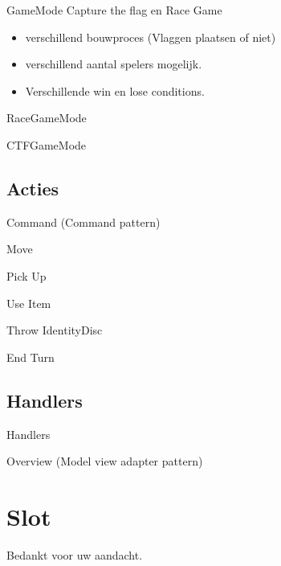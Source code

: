 \documentclass[11pt,t]{beamer}
\begin{document}
\begin{frame}{GameMode}
Capture the flag en Race Game
\begin{itemize}
\item verschillend bouwproces (Vlaggen plaatsen of niet)
\item verschillend aantal spelers mogelijk.
\item Verschillende win en lose conditions.
\end{itemize}

\end{frame}
\begin{frame}{RaceGameMode}
\end{frame}

\begin{frame}{CTFGameMode}
\end{frame}

\subsection{Acties}

\begin{frame}{Command (Command pattern)}
\end{frame}

\begin{frame}{Move}
\end{frame}

\begin{frame}{Pick Up}
\end{frame}

\begin{frame}{Use Item}
\end{frame}

\begin{frame}{Throw IdentityDisc}
\end{frame}

\begin{frame}{End Turn}
\end{frame}

\subsection{Handlers}

\begin{frame}{Handlers}
\end{frame}

\begin{frame}{Overview (Model view adapter pattern)}

\end{frame}
\section{Slot}
\begin{frame}
\vspace{1.5in}
\begin{center}
Bedankt voor uw aandacht.
\end{center}
\end{frame}
\end{document}
